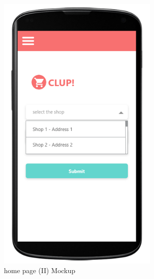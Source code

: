 \begin{figure}[H]
  \centering
  \includegraphics[width=0.7\textwidth,keepaspectratio]{images/10.png}
  \caption{home page (II) Mockup}
\end{figure}
